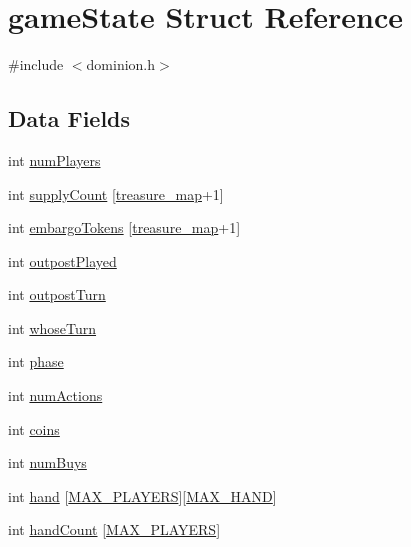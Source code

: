 \hypertarget{structgameState}{}\section{game\+State Struct Reference}
\label{structgameState}


{\ttfamily \#include $<$dominion.\+h$>$}

\subsection*{Data Fields}
\begin{DoxyCompactItemize}
\item 
int \hyperlink{structgameState_a37ee5e54c60329e34f5cc9466055f687}{num\+Players}
\item 
int \hyperlink{structgameState_af304278b4e333afc544c44350f9c9614}{supply\+Count} \mbox{[}\hyperlink{dominion_8h_a90493cb4d9abd6726dfc438c413a13bea7afb3eea128840c336919e9c7c29732e}{treasure\+\_\+map}+1\mbox{]}
\item 
int \hyperlink{structgameState_ad5d3a35640d9d9d585a9703346366987}{embargo\+Tokens} \mbox{[}\hyperlink{dominion_8h_a90493cb4d9abd6726dfc438c413a13bea7afb3eea128840c336919e9c7c29732e}{treasure\+\_\+map}+1\mbox{]}
\item 
int \hyperlink{structgameState_a55467c4b3f593011abe151a23dc83ece}{outpost\+Played}
\item 
int \hyperlink{structgameState_a147a9055baeeb175c4326fa2aa7a5ee4}{outpost\+Turn}
\item 
int \hyperlink{structgameState_afeb6b7ee4fe3050c7031e91e70d5c7d5}{whose\+Turn}
\item 
int \hyperlink{structgameState_a34b8f764a6c851ea4af9d547420ffaf1}{phase}
\item 
int \hyperlink{structgameState_a0c8d732b53318c4dffccedfc971eaea8}{num\+Actions}
\item 
int \hyperlink{structgameState_a47452bbc9e46dd4fdb4e81f7795c9fa0}{coins}
\item 
int \hyperlink{structgameState_a67849e0ea28cb9c2e967cefd5b616613}{num\+Buys}
\item 
int \hyperlink{structgameState_a8f91bb7a0f3cf01dc5df1472efdbb287}{hand} \mbox{[}\hyperlink{dominion_8h_a1c346c944e8204fd06dc057393c7c96d}{M\+A\+X\+\_\+\+P\+L\+A\+Y\+E\+RS}\mbox{]}\mbox{[}\hyperlink{dominion_8h_a1cfb7b0373f2296503070d45946df191}{M\+A\+X\+\_\+\+H\+A\+ND}\mbox{]}
\item 
int \hyperlink{structgameState_ab1a195f7280c84f81718a1bc9a50ad90}{hand\+Count} \mbox{[}\hyperlink{dominion_8h_a1c346c944e8204fd06dc057393c7c96d}{M\+A\+X\+\_\+\+P\+L\+A\+Y\+E\+RS}\mbox{]}

\end{DoxyCompactItemize}

